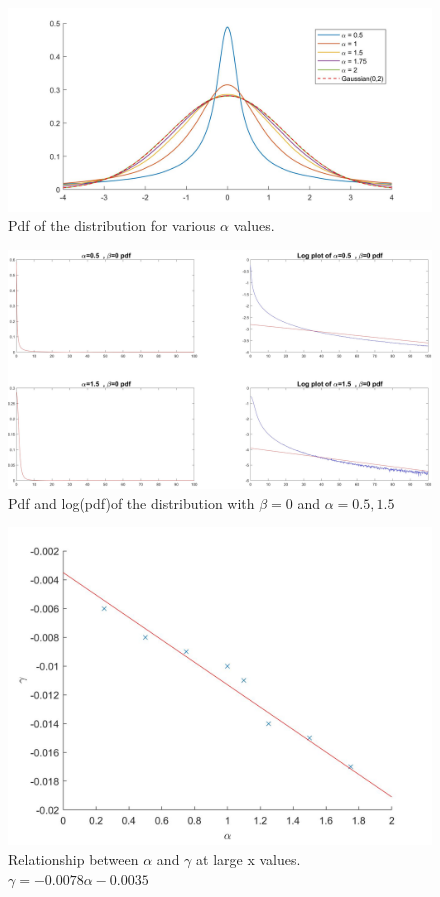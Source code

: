 \documentclass[twoside,twocolumn]{article}
\begin{document}
\begin{figure}[h]
  \centering
    \includegraphics[width=\textwidth]{4ftr3}
  \caption{Pdf of the distribution for various $\alpha$ values.}
  \label{fig:4ftr3}
\end{figure}
\begin{figure}[h]
  \centering
    \includegraphics[width=\linewidth]{4ftr1}
  \caption{Pdf and log(pdf)of the distribution with $\beta = 0 $ and $ \alpha =0.5 , 1.5$}
  \label{fig:4ftr1}
\end{figure}

\begin{figure}[h]
  \centering
    \includegraphics[width=\linewidth]{4ftr2}
  \caption{Relationship between $\alpha$ and $\gamma$ at large x values. $\gamma=-0.0078\alpha-0.0035$}
  \label{fig:4ftr2}
\end{figure}
\end{document}
